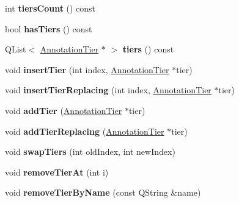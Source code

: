 \begin{DoxyCompactItemize}
int {\bfseries tiers\+Count} () const
\item 
\mbox{\label{class_annotation_tier_group_a3a9e5dfe0b01d4acfd8e28289c9d75ee}} 
bool {\bfseries has\+Tiers} () const
\item 
\mbox{\label{class_annotation_tier_group_a0a868f1406c1c5b989b9303bb1000715}} 
Q\+List$<$ \hyperlink{class_annotation_tier}{Annotation\+Tier} $\ast$ $>$ {\bfseries tiers} () const
\item 
\mbox{\label{class_annotation_tier_group_a9f6129cfdb96ce9084d49f4a4f3f9581}} 
void {\bfseries insert\+Tier} (int index, \hyperlink{class_annotation_tier}{Annotation\+Tier} $\ast$tier)
\item 
\mbox{\label{class_annotation_tier_group_a394c786058d3650fb2b170493ad21454}} 
void {\bfseries insert\+Tier\+Replacing} (int index, \hyperlink{class_annotation_tier}{Annotation\+Tier} $\ast$tier)
\item 
\mbox{\label{class_annotation_tier_group_a96df167d0aac7e8f38cd8267a29d5f33}} 
void {\bfseries add\+Tier} (\hyperlink{class_annotation_tier}{Annotation\+Tier} $\ast$tier)
\item 
\mbox{\label{class_annotation_tier_group_ad477a0009c24b987406dbf1dc3d4d9a0}} 
void {\bfseries add\+Tier\+Replacing} (\hyperlink{class_annotation_tier}{Annotation\+Tier} $\ast$tier)
\item 
\mbox{\label{class_annotation_tier_group_ad7fb9197ffbf6d128ce0d0e8c9c42874}} 
void {\bfseries swap\+Tiers} (int old\+Index, int new\+Index)
\item 
\mbox{\label{class_annotation_tier_group_aeded4a0c4c3d6a7f2f5df08b042c3349}} 
void {\bfseries remove\+Tier\+At} (int i)
\item 
\mbox{\label{class_annotation_tier_group_a77b0a3cce3e181340446c1ed53fee04b}} 
void {\bfseries remove\+Tier\+By\+Name} (const Q\+String \&name)
\item 

\end{DoxyCompactItemize}
